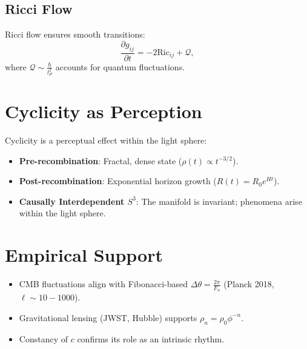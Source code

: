 \documentclass[11pt]{article}
\begin{document}
\subsection{Ricci Flow}
Ricci flow ensures smooth transitions:
\[
\frac{\partial g_{ij}}{\partial t} = -2 \text{Ric}_{ij} + \mathcal{Q},
\]
where $\mathcal{Q} \sim \frac{\hbar}{l_P^2}$ accounts for quantum fluctuations.

\section{Cyclicity as Perception}
Cyclicity is a perceptual effect within the light sphere:
\begin{itemize}
    \item \textbf{Pre-recombination}: Fractal, dense state ($\rho(t) \propto t^{-3/2}$).
    \item \textbf{Post-recombination}: Exponential horizon growth ($R(t) = R_0 e^{Ht}$).
    \item \textbf{Causally Interdependent $S^3$}: The manifold is invariant; phenomena arise within the light sphere.
\end{itemize}

\section{Empirical Support}
\begin{itemize}
    \item CMB fluctuations align with Fibonacci-based $\Delta \theta = \frac{2\pi}{F_n}$ (Planck 2018, $\ell \sim 10-1000$).
    \item Gravitational lensing (JWST, Hubble) supports $\rho_n = \rho_0 \phi^{-n}$.
    \item Constancy of $c$ confirms its role as an intrinsic rhythm.
\end{itemize}
\end{document}
